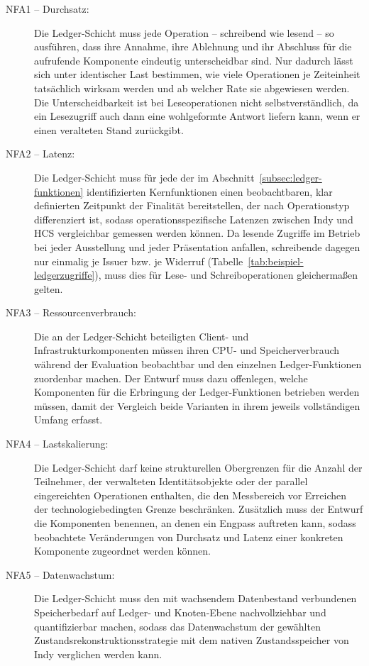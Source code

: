 \begin{description}
  \item[NFA1 -- Durchsatz:] Die Ledger-Schicht muss jede Operation -- schreibend wie lesend -- so ausführen, dass ihre Annahme, ihre Ablehnung und ihr Abschluss für die aufrufende Komponente eindeutig unterscheidbar sind. Nur dadurch lässt sich unter identischer Last bestimmen, wie viele Operationen je Zeiteinheit tatsächlich wirksam werden und ab welcher Rate sie abgewiesen werden. Die Unterscheidbarkeit ist bei Leseoperationen nicht selbstverständlich, da ein Lesezugriff auch dann eine wohlgeformte Antwort liefern kann, wenn er einen veralteten Stand zurückgibt.
  \item[NFA2 -- Latenz:] Die Ledger-Schicht muss für jede der im Abschnitt~\ref{subsec:ledger-funktionen} identifizierten Kernfunktionen einen beobachtbaren, klar definierten Zeitpunkt der Finalität bereitstellen, der nach Operationstyp differenziert ist, sodass operationsspezifische Latenzen zwischen Indy und HCS vergleichbar gemessen werden können. Da lesende Zugriffe im Betrieb bei jeder Ausstellung und jeder Präsentation anfallen, schreibende dagegen nur einmalig je Issuer bzw. je Widerruf (Tabelle~\ref{tab:beispiel-ledgerzugriffe}), muss dies für Lese- und Schreiboperationen gleichermaßen gelten.
  \item[NFA3 -- Ressourcenverbrauch:] Die an der Ledger-Schicht beteiligten Client- und Infrastrukturkomponenten müssen ihren CPU- und Speicherverbrauch während der Evaluation beobachtbar und den einzelnen Ledger-Funktionen zuordenbar machen. Der Entwurf muss dazu offenlegen, welche Komponenten für die Erbringung der Ledger-Funktionen betrieben werden müssen, damit der Vergleich beide Varianten in ihrem jeweils vollständigen Umfang erfasst.
  \item[NFA4 -- Lastskalierung:] Die Ledger-Schicht darf keine strukturellen Obergrenzen für die Anzahl der Teilnehmer, der verwalteten Identitätsobjekte oder der parallel eingereichten Operationen enthalten, die den Messbereich vor Erreichen der technologiebedingten Grenze beschränken. Zusätzlich muss der Entwurf die Komponenten benennen, an denen ein Engpass auftreten kann, sodass beobachtete Veränderungen von Durchsatz und Latenz einer konkreten Komponente zugeordnet werden können.
  \item[NFA5 -- Datenwachstum:] Die Ledger-Schicht muss den mit wachsendem Datenbestand verbundenen Speicherbedarf auf Ledger- und Knoten-Ebene nachvollziehbar und quantifizierbar machen, sodass das Datenwachstum der gewählten Zustandsrekonstruktionsstrategie mit dem nativen Zustandsspeicher von Indy verglichen werden kann.

\end{description}
